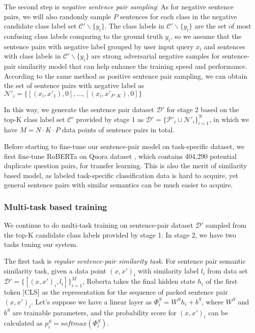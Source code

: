 The  second  step  is  \emph{negative sentence pair sampling}: As for negative
sentence  pairs,  we will also randomly sample $P$ sentences for each class in
the negative candidate class label set $\mathcal{C'}\backslash \{y_{i}\}$. The
class  labels  in  $\mathcal{C'}\backslash  \{y_{i}\}$  are  the  set  of most
confusing  class  labels comparing to the ground truth ${y_{i}}$, so we assume
that  the  sentence  pairs  with  negative  label  grouped by user input query
$x_{i}$  and sentences with class labels in $\mathcal{C'}\backslash \{y_{i}\}$
are  strong  adversarial  negative  samples for sentence-pair similarity model
that  can  help  enhance  the training speed and performance. According to the
same  method  as  positive  sentence  pair  sampling, we can obtain the set of
sentence  pairs  with  negative label as $\mathcal{N'}_{i}=\{[(x_{i}, x'_{1}),
0], ..., [(x_{i}, x'_{P\cdot K}), 0]\}$

In  this way, we generate the sentence pair dataset $\mathcal{D'}$ for stage 2
based  on  the  top-K  class  label  set $\mathcal{C'}$ provided by stage 1 as
$\mathcal{D'}=\{\mathcal{P'}_{i}\cup  \mathcal{N'}_{i}\}_{i=1}^{N}$,  in which
we have $M=N\cdot K\cdot P$ data points of sentence pairs in total.

Before starting to fine-tune our sentence-pair model on task-specific dataset,
we  first  fine-tune  RoBERTa on Quora dataset  \cite{iyer2017first}, which
contains  404,290  potential  duplicate question pairs, for transfer learning.
This  is  also  the  merit of similarity based model, as labeled task-specific
classification  data  is  hard  to  acquire,  yet  general sentence pairs with
similar semantics can be much easier to acquire.

\subsubsection*{Multi-task based training}
We   continue  to  do  multi-task  training  on  sentence-pair  dataset
$\mathcal{D'}$ sampled from the top-K candidate class labels provided by stage
1. In stage 2, we have two tasks tuning our system.

The first task is \emph{regular sentence-pair similarity task}.
For  sentence  pair semantic similarity task, given a data point $(x, x')_{i}$
with       similarity       label       $l_{i}$       from       data      set
$\mathcal{D'}=\{[(x,x')_{i},l_{i}]\}_{i=1}^{M}$,   Roberta   takes  the  final
hidden  state  $h_{i}$  of the first token [CLS] as the representation for the
sequence of packed sentence pair $(x, x')_{i}$. Let's suppose we have a linear
layer  as  ${\Phi}^S_{i}=W^Sh_{i}+b^S$,  where  $W^S$  and $b^S$ are trainable
parameters,  and  the probability score for $(x, x')_{i}$ can be calculated as
$p^S_{i}=softmax({\Phi}^S_{i})$.

